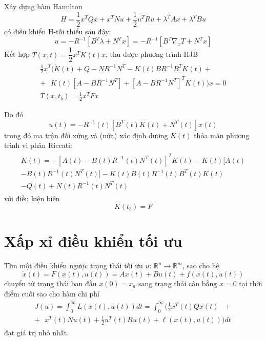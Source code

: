 \documentclass[11pt]{beamer}
\begin{document}
\begin{frame}
	Xây dựng hàm Hamilton $$H = \frac{1}{2}x^TQx + x^TNu + \frac{1}{2}u^TRu + \lambda^TAx + \lambda^TBu$$ có điều khiển H-tối thiểu sau đây: $$u = -R^{-1}[B^T\lambda + N^Tx] = -R^{-1}[B^T\nabla_xT + N^Tx]$$ Kết hợp $T(x, t) = \dfrac{1}{2}x^TK(t)x$, thu được phương trình HJB
		\begin{eqnarray}
	\frac{1}{2}x^T \Big(\dot{K}(t) + Q - NR^{-1}N^T - K(t)BR^{-1}B^TK(t) + \nonumber \\ + \text{ } K(t)[A-BR^{-1}N^T] + [A - BR^{-1}N^T]^TK(t)\Big)x = 0 \nonumber\\
	T(x, t_b) = \frac{1}{2}x^TFx \nonumber
	\end{eqnarray}
\end{frame}


\begin{frame}
		Do đó $$u(t) = -R^{-1}(t)[B^T(t)K(t) + N^T(t)]x(t)$$
	trong đó ma trận đối xứng và (nửa) xác định dương $K(t)$ thỏa mãn phương trình vi phân Riccati:
	\begin{eqnarray}
	\begin{split}
	\dot{K}(t) = -[A(t) - B(t)R^{-1}(t)N^T(t)]^TK(t) - K(t)[A(t) \\- B(t)R^{-1}(t)N^T(t)] -K(t)B(t)R^{-1}(t)B^T(t)K(t) \\ - Q(t) + N(t)R^{-1}(t)N^T(t) \nonumber
	\end{split}	
	\end{eqnarray} với điều kiện biên $$K(t_b) = F$$
\end{frame}

\section{Xấp xỉ điều khiển tối ưu}

\begin{frame}
		Tìm một điều khiển ngược trạng thái tối ưu  $u$: $\mathbb{R}^n \to \mathbb{R}^m$, sao cho hệ $$\dot{x}(t) = F(x(t), u(t)) = Ax(t) + Bu(t) + f(x(t), u(t))$$ chuyển từ trạng thái ban đầu $x(0) = x_a$ sang trạng thái cân bằng $x = 0$ tại thời điểm cuối sao cho hàm chi phí \begin{eqnarray}
	\begin{split}
	J(u) = \int_{0}^{\infty}L(x(t), u(t))dt 
	= \int_{0}^{\infty}\Big(\frac{1}{2}x^T(t)Qx(t) \text{ }+ \\+ \text{ } x^T(t)Nu(t) + \frac{1}{2}u^T(t)Ru(t) + \ell(x(t), u(t)) \Big)dt \nonumber 
	\end{split}
	\end{eqnarray} đạt giá trị nhỏ nhất.
\end{frame}
\end{document}
